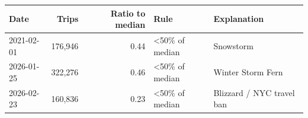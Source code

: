 \begin{tabular}{lrrll}
\toprule
Date & Trips & Ratio to median & Rule & Explanation \\
\midrule
2021-02-01 & 176,946 & 0.44 & \textless{}50\% of median & Snowstorm \\
2026-01-25 & 322,276 & 0.46 & \textless{}50\% of median & Winter Storm Fern \\
2026-02-23 & 160,836 & 0.23 & \textless{}50\% of median & Blizzard / NYC travel ban \\
\bottomrule
\end{tabular}
